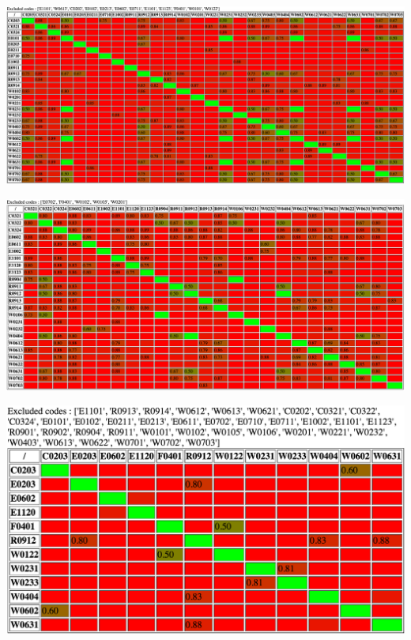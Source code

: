 \documentclass[12pt, a4paper]{article}
\begin{document}
\renewcommand{\textfraction}{0.01}
\renewcommand{\topfraction}{0.01}
\renewcommand{\bottomfraction}{0.01}
\renewcommand{\floatpagefraction}{0.01}
\setcounter{totalnumber}{1}

\includegraphics[angle=90,origin=c,totalheight=0.99\textheight]{cap1}

\includegraphics[angle=90,origin=c,totalheight=\textheight]{cap2}

\includegraphics[angle=90,origin=c,totalheight=\textheight]{cap3}
\end{document}
